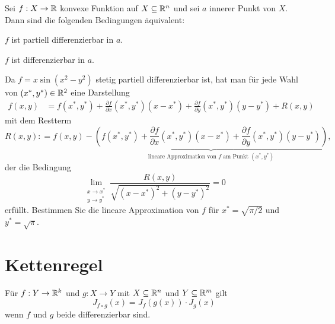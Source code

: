 \begin{thm} Sei $f : X \to \mathbb{R}$ konvexe Funktion auf $X \subseteq \mathbb{R}^n$ und sei $a$ innerer Punkt von $X$. Dann sind die folgenden Bedingungen äquivalent: 
	\begin{enumi}
		\item $f$ ist partiell differenzierbar in $a$. 
		\item $f$ ist differenzierbar in $a$. 
	\end{enumi} 
\end{thm} 

\begin{aufg}
	Da $f = x \sin(x^2  -y^2)$ stetig partiell differenzierbar ist, hat man für jede Wahl von $(x^\ast,y^\ast) \in \mathbb{R}^2$ eine Darstellung 
	\begin{align*}
		f(x,y) & =  f(x^\ast, y^\ast ) + \frac{\partial f}{\partial x} (x^\ast,y^\ast) (x-x^\ast ) + \frac{\partial f}{\partial y} (x^\ast,y^\ast) (y - y^\ast) + R(x,y)
	\end{align*}
	mit dem Restterm 
	\[
		R(x,y) : = f(x,y)  - \underbrace{\left( f(x^\ast, y^\ast ) + \frac{\partial f}{\partial x} (x^\ast,y^\ast) (x-x^\ast ) + \frac{\partial f}{\partial y} (x^\ast,y^\ast) (y - y^\ast) \right)}_{\text{lineare Approximation von $f$ am Punkt $(x^\ast,y^\ast)$}}, 
	\]
	 der die Bedingung 
	\[
			\lim_{\substack{x \to x^\ast \\ y \to y^\ast} } \frac{ R(x,y)}{\sqrt{ (x-x^\ast)^2 + (y-y^\ast)^2}} = 0
	\]
	erfüllt. Bestimmen Sie die lineare Approximation von $f$ für $x^\ast = \sqrt{\pi/2}$ und $y^\ast = \sqrt{\pi}$. 
\end{aufg} 

\section{Kettenregel}

\begin{thm}[Kettenregel]
	Für $ f : Y \to \mathbb{R}^k$ und $g : X \to Y$ mit $X \subseteq \mathbb{R}^n$ und $Y \subseteq \mathbb{R}^m$ gilt 
	\[
		J_{f \circ g}(x)  = J_f (g(x)) \cdot J_g (x)
	\]
	wenn $f$ und $g$ beide differenzierbar sind. 
\end{thm}

